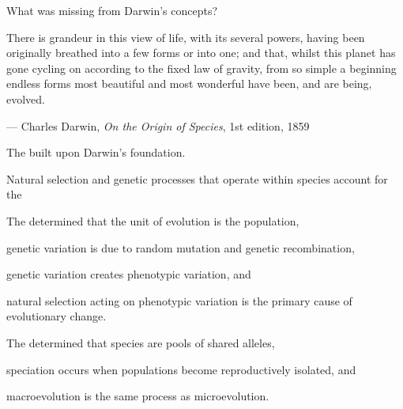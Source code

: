 \documentclass[t]{beamer}
\begin{document}
\begin{frame}[t]{What was missing from Darwin's concepts?}
\vspace{-\baselineskip}
\begin{multicols}{2}
\bigskip


\vfilll

\columnbreak

There is grandeur in this view of life, with its several powers, having been originally breathed into a few forms or into one; and that, whilst this planet has gone cycling on according to the fixed law of gravity, from so simple a beginning endless forms most beautiful and most wonderful have been, and are being, evolved.
	
\vspace{\baselineskip}
	
— Charles Darwin, \textit{On the Origin of Species}, 1st edition, 1859
	
	
\end{multicols}
\end{frame}

\begin{frame}{The  built upon Darwin's foundation.}

\hangpara Natural selection and genetic processes that operate within species account for the 

\end{frame}

\begin{frame}[t]{The  determined that}
\hangpara the unit of evolution is the population,

\hangpara genetic variation is due to random mutation and genetic recombination,

\hangpara genetic variation creates phenotypic variation, and

\hangpara natural selection acting on phenotypic variation is the primary cause of evolutionary change.

\end{frame}

\begin{frame}[t]{The  determined that}
\hangpara species are pools of shared alleles, 

\hangpara speciation occurs when populations become reproductively isolated, and

\hangpara macroevolution is the same process as microevolution.

\pause

\hangpara {}


\end{frame}
\end{document}
